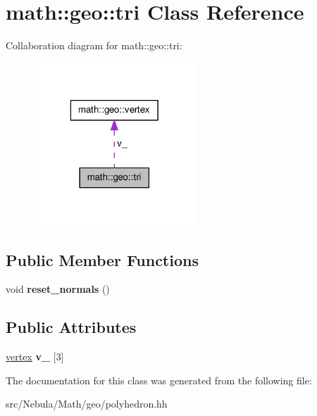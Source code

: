 \hypertarget{classmath_1_1geo_1_1tri}{\section{math\-:\-:geo\-:\-:tri \-Class \-Reference}
\label{classmath_1_1geo_1_1tri}
}


\-Collaboration diagram for math\-:\-:geo\-:\-:tri\-:\nopagebreak
\begin{figure}[H]
\begin{center}
\leavevmode
\includegraphics[width=172pt]{classmath_1_1geo_1_1tri__coll__graph}
\end{center}
\end{figure}
\subsection*{\-Public \-Member \-Functions}
\begin{DoxyCompactItemize}
\item 
\hypertarget{classmath_1_1geo_1_1tri_a9781ddeac1d6e0795ede6818f1ca52b8}{void {\bfseries reset\-\_\-normals} ()}\label{classmath_1_1geo_1_1tri_a9781ddeac1d6e0795ede6818f1ca52b8}

\end{DoxyCompactItemize}
\subsection*{\-Public \-Attributes}
\begin{DoxyCompactItemize}
\item 
\hypertarget{classmath_1_1geo_1_1tri_a1578bb4ca85d7adabc44b48e1fbbbe29}{\hyperlink{classmath_1_1geo_1_1vertex}{vertex} {\bfseries v\-\_\-} \mbox{[}3\mbox{]}}\label{classmath_1_1geo_1_1tri_a1578bb4ca85d7adabc44b48e1fbbbe29}

\end{DoxyCompactItemize}


\-The documentation for this class was generated from the following file\-:\begin{DoxyCompactItemize}
\item 
src/\-Nebula/\-Math/geo/polyhedron.\-hh\end{DoxyCompactItemize}

